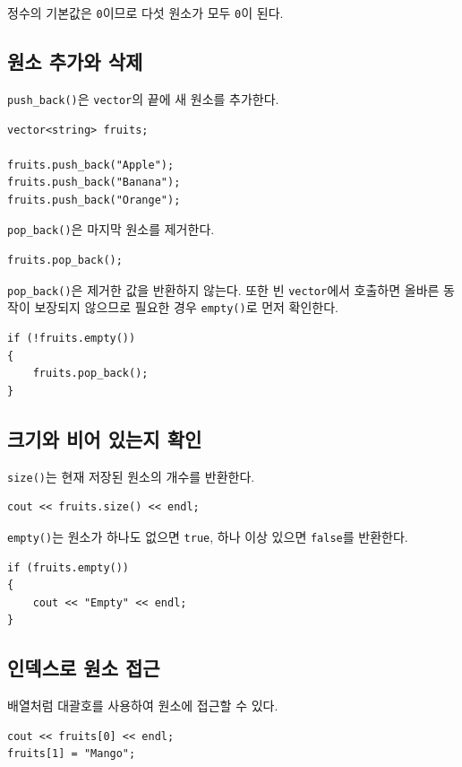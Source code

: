 \documentclass[11pt,a4paper]{article}
\begin{document}
정수의 기본값은 \texttt{0}이므로 다섯 원소가 모두 \texttt{0}이 된다.

\subsection{원소 추가와 삭제}
\texttt{push\_back()}은 \texttt{vector}의 끝에 새 원소를 추가한다.

\begin{lstlisting}
vector<string> fruits;

fruits.push_back("Apple");
fruits.push_back("Banana");
fruits.push_back("Orange");
\end{lstlisting}

\texttt{pop\_back()}은 마지막 원소를 제거한다.

\begin{lstlisting}
fruits.pop_back();
\end{lstlisting}

\texttt{pop\_back()}은 제거한 값을 반환하지 않는다. 또한 빈 \texttt{vector}에서 호출하면 올바른 동작이 보장되지 않으므로 필요한 경우 \texttt{empty()}로 먼저 확인한다.

\begin{lstlisting}
if (!fruits.empty())
{
    fruits.pop_back();
}
\end{lstlisting}

\subsection{크기와 비어 있는지 확인}
\texttt{size()}는 현재 저장된 원소의 개수를 반환한다.

\begin{lstlisting}
cout << fruits.size() << endl;
\end{lstlisting}

\texttt{empty()}는 원소가 하나도 없으면 \texttt{true}, 하나 이상 있으면 \texttt{false}를 반환한다.

\begin{lstlisting}
if (fruits.empty())
{
    cout << "Empty" << endl;
}
\end{lstlisting}

\subsection{인덱스로 원소 접근}
배열처럼 대괄호를 사용하여 원소에 접근할 수 있다.

\begin{lstlisting}
cout << fruits[0] << endl;
fruits[1] = "Mango";
\end{lstlisting}
\end{document}
